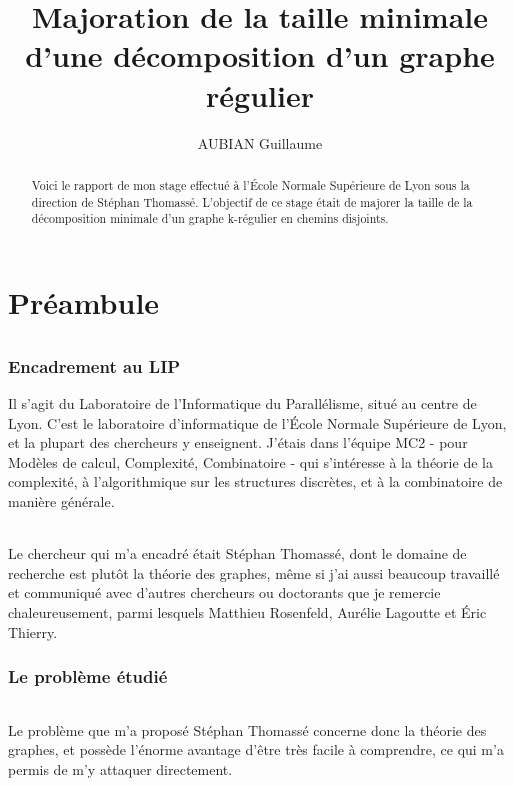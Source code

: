 \documentclass[a4paper]{article}
\title{Majoration de la taille minimale d'une décomposition d'un graphe régulier}
\author{AUBIAN Guillaume}
\theoremstyle{definition}
\theoremstyle{remark}
\begin{document}
\maketitle

\begin{abstract}
Voici le rapport de mon stage effectué à l'École Normale Supérieure de Lyon sous la direction de
Stéphan Thomassé. L'objectif de ce stage était de majorer la taille
de la décomposition minimale d'un graphe k-régulier en chemins disjoints.
\end{abstract}

\part{Préambule}

\paragraph{}

\section{Encadrement au LIP}
Il s'agit du Laboratoire de l'Informatique du Parallélisme, situé au centre de Lyon. C'est le laboratoire d'informatique de l'École Normale 
Supérieure de Lyon, et la plupart des chercheurs y enseignent. J'étais dans l'équipe MC2 - pour Modèles de calcul, Complexité, Combinatoire -
qui s'intéresse à la théorie de la complexité, à 
l'algorithmique sur les structures discrètes, et à la combinatoire de 
manière générale.


\paragraph{}
Le chercheur qui m'a encadré était Stéphan Thomassé, dont le domaine
de recherche est plutôt la théorie des graphes, même si j'ai aussi
beaucoup travaillé et communiqué avec d'autres chercheurs ou doctorants 
que je remercie chaleureusement, parmi lesquels Matthieu Rosenfeld, Aurélie Lagoutte et Éric Thierry.


\section{Le problème étudié}

\paragraph{}
Le problème que m'a proposé Stéphan Thomassé concerne donc la théorie 
des graphes, et possède l'énorme avantage d'être très facile à 
comprendre, ce qui m'a permis de m'y attaquer directement.
\end{document}
